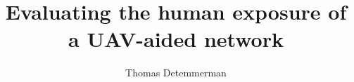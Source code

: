\documentclass[11pt,a4paper,twoside, openany]{book}
\title{Evaluating the human exposure of a UAV-aided network}
\author{Thomas Detemmerman}
\begin{document}
\newpage\thispagestyle{empty}\mbox{}  %
\tableofcontents                      %
\listoffigures                        %
\listoftables                         %
\listoflistings                       %

\printglossaries

%
%







\begin{appendices}

\end{appendices}
\end{document}

